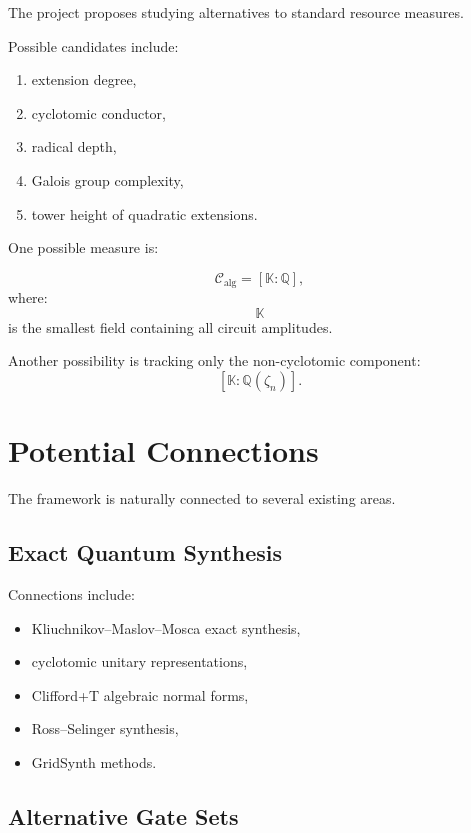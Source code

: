 \documentclass[12pt,a4paper]{article}
\newcommand{\cyc}{\mathbb{Q}(\zeta_n)}
\begin{document}
The project proposes studying alternatives to standard resource measures.

Possible candidates include:

\begin{enumerate}
    \item extension degree,
    \item cyclotomic conductor,
    \item radical depth,
    \item Galois group complexity,
    \item tower height of quadratic extensions.
\end{enumerate}

One possible measure is:

\[
\mathcal C_{\mathrm{alg}}
=
[\mathbb K : \mathbb Q],
\]
where:
\[
\mathbb K
\]
is the smallest field containing all circuit amplitudes.

Another possibility is tracking only the non-cyclotomic component:
\[
[\mathbb K : \cyc].
\]


\section{Potential Connections}

The framework is naturally connected to several existing areas.

\subsection{Exact Quantum Synthesis}

Connections include:

\begin{itemize}
    \item Kliuchnikov--Maslov--Mosca exact synthesis,
    \item cyclotomic unitary representations,
    \item Clifford+T algebraic normal forms,
    \item Ross--Selinger synthesis,
    \item GridSynth methods.
\end{itemize}

\subsection{Alternative Gate Sets}
\end{document}
